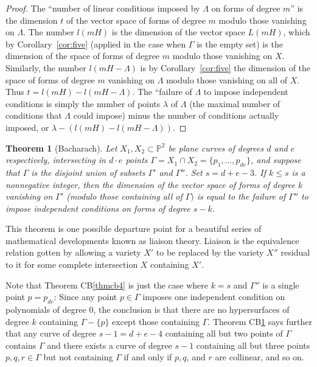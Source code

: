 \documentclass{bull-l}
\theoremstyle{pplain}
\newtheorem{thmcb}{Theorem}
\theoremstyle{definition}
\begin{document}
\begin{proof} The ``number of linear conditions imposed by $\Lambda$ on forms
of degree $m$'' is the dimension $t$ of the vector space of forms of degree $m$
modulo those vanishing on $\Lambda$.  The number $l(mH)$ is the dimension of
the vector space $L(mH)$, which by Corollary~\ref{cor:five} (applied in the
case when $\Gamma$ is the empty set) is the dimension of the space of forms of
degree $m$ modulo those vanishing on $X$.  Similarly, the number
$l(mH-\Lambda)$ is by Corollary~\ref{cor:five} the dimension of the space of
forms of degree $m$ vanishing on $\Lambda$ modulo those vanishing on all of
$X$.  Thus $t=l(mH)-l(mH-\Lambda)$.  The ``failure of $\Lambda$ to impose
independent conditions is simply the number of points $\lambda$ of $\Lambda$
(the maximal number of conditions that $\Lambda$ could impose) minus the number
of conditions actually imposed, or $\lambda-(l(mH)-l(mH-\Lambda))$.
\end{proof}

\begin{thmcb}[Bacharach] \label{thmcb5}
Let $X_1,X_2\subset \mathbb{P}^2$ be plane curves of degrees $d$ and $e$
respectively, intersecting in $d\cdot e$ points  $\Gamma=X_1\cap
X_2=\{p_1,\dots,p_{de}\}$, and suppose that $\Gamma$ is the
disjoint union of subsets $\Gamma'$ and $\Gamma''$.  Set $s=d+e-3$.  If $k\le
s$ is a nonnegative integer, then the dimension of the vector space of forms of
degree $k$ vanishing on $\Gamma'$ \textup{(}modulo those containing all 
of $\Gamma)$ is equal to the failure of $\Gamma''$ to impose independent 
conditions on forms of degree $s-k$.
\end{thmcb}

This theorem is one possible departure point for a beautiful series of 
mathematical developments known as liaison theory.   Liaison is the equivalence
relation gotten by allowing a variety $X'$ to be replaced by the variety $X''$
residual to it for some complete intersection $X$ containing $X'$.

Note that Theorem CB\ref{thmcb4} is just the case where $k=s$ and $\Gamma''$ is
a single point $p=p_{de}$: Since any point $p\in \Gamma$ imposes one 
independent condition on polynomials of degree 0, the conclusion is that there
are no hypersurfaces of degree $k$ containing $\Gamma-\{p\}$ except those
containing $\Gamma$.  Theorem CB\ref{thmcb5} says further that any curve of
degree $s-1=d+e-4$ containing all but two points of $\Gamma$ contains $\Gamma$
and there exists a curve of degree $s-1$ containing all but three points
$p,q,r\in \Gamma$ but not containing $\Gamma$ if and only if $p,q$, and $r$ are 
collinear, and so on.
\end{document}
